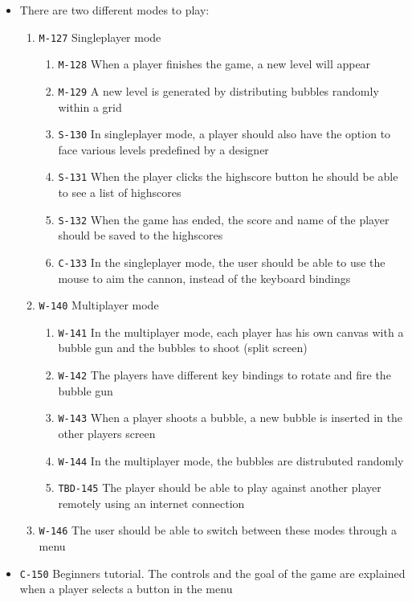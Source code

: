 \documentclass[a4paper]{article}
\begin{document}
\begin{itemize}
  \item There are two different modes to play:
  \begin{enumerate}
      \item \texttt{M-127} Singleplayer mode
      \begin{enumerate}
          \item \texttt{M-128} When a player finishes the game, a new level will appear
          \item \texttt{M-129} A new level is generated by distributing bubbles randomly within a grid
          \item \texttt{S-130} In singleplayer mode, a player should also have the option to face various levels predefined by a designer
          \item \texttt{S-131} When the player clicks the highscore button he should be able to see a list of highscores
  	      \item \texttt{S-132} When the game has ended, the score and name of the player should be saved to the highscores
          \item \texttt{C-133} In the singleplayer mode, the user should be able to use the mouse to aim the cannon, instead of the keyboard bindings
      \end{enumerate}
      
      \item \texttt{W-140} Multiplayer mode
      \begin{enumerate}
          \item \texttt{W-141} In the multiplayer mode, each player has his own canvas with a bubble gun and the bubbles to shoot (split screen)
          \item \texttt{W-142} The players have different key bindings to rotate and fire the bubble gun
          \item \texttt{W-143} When a player shoots a bubble, a new bubble is inserted in the other players screen
          \item \texttt{W-144} In the multiplayer mode, the bubbles are distrubuted randomly
          \item \texttt{TBD-145} The player should be able to play against another player remotely using an internet connection
      \end{enumerate}
      
      \item \texttt{W-146} The user should be able to switch between these modes through a menu
  \end{enumerate}
  \item \texttt{C-150} Beginners tutorial. The controls and the goal of the game are explained when a player selects a button in the menu
\end{itemize}
\end{document}
